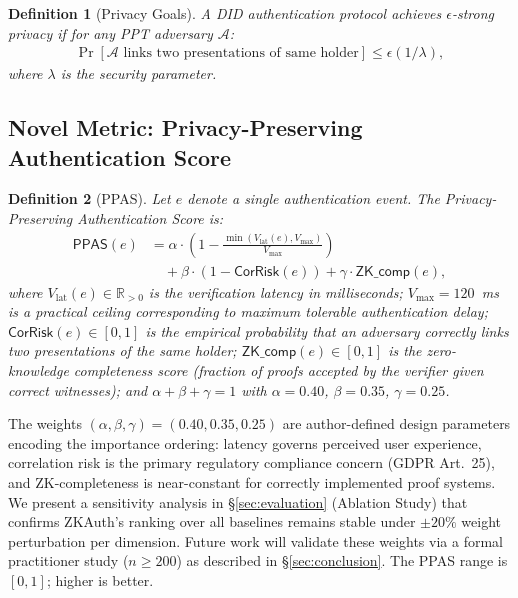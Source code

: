 \documentclass[journal,12pt,onecolumn]{IEEEtran}
\newtheorem{definition}{Definition}
\begin{document}
\begin{definition}[Privacy Goals]
A DID authentication protocol achieves \emph{$\epsilon$-strong privacy}
if for any PPT adversary $\mathcal{A}$:
\begin{align}
  \Pr\left[\mathcal{A} \text{ links two presentations of same holder}\right]
  \leq \epsilon(1/\lambda),
\end{align}
where $\lambda$ is the security parameter.
\end{definition}

\subsection{Novel Metric: Privacy-Preserving Authentication Score}

\begin{definition}[PPAS]
\label{def:ppas}
Let $e$ denote a single authentication event. The
\textit{Privacy-Preserving Authentication Score} is:
\begin{align}
  \mathsf{PPAS}(e) &= \alpha \cdot \left(1 - \frac{\min(V_{\text{lat}}(e),
    V_{\max})}{V_{\max}}\right) \nonumber \\
  &\quad + \beta \cdot \left(1 - \mathsf{CorRisk}(e)\right)
    + \gamma \cdot \mathsf{ZK\_comp}(e),
  \label{eq:ppas}
\end{align}
where $V_{\text{lat}}(e) \in \mathbb{R}_{>0}$ is the verification
latency in milliseconds; $V_{\max} = 120$~ms is a practical ceiling
corresponding to maximum tolerable authentication delay;
$\mathsf{CorRisk}(e) \in [0,1]$ is the empirical probability that an
adversary correctly links two presentations of the same holder;
$\mathsf{ZK\_comp}(e) \in [0,1]$ is the zero-knowledge completeness
score (fraction of proofs accepted by the verifier given correct
witnesses); and $\alpha + \beta + \gamma = 1$ with $\alpha = 0.40$,
$\beta = 0.35$, $\gamma = 0.25$.
\end{definition}

The weights $(\alpha, \beta, \gamma) = (0.40, 0.35, 0.25)$ are
author-defined design parameters encoding the importance ordering:
latency governs perceived user experience, correlation risk is the
primary regulatory compliance concern (GDPR Art.\ 25), and
ZK-completeness is near-constant for correctly implemented proof
systems. We present a sensitivity analysis in §\ref{sec:evaluation}
(Ablation Study) that confirms ZKAuth's ranking over all baselines
remains stable under $\pm 20\%$ weight perturbation per dimension.
Future work will validate these weights via a formal practitioner study
($n \geq 200$) as described in §\ref{sec:conclusion}. The PPAS range
is $[0,1]$; higher is better.
\end{document}
